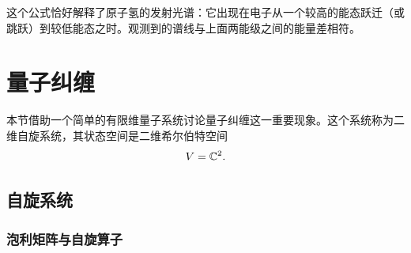 这个公式恰好解释了原子氢的发射光谱：它出现在电子从一个较高的能态跃迁（或跳跃）到较低能态之时。观测到的谱线与上面两能级之间的能量差相符。


\section{量子纠缠}

本节借助一个简单的有限维量子系统讨论量子纠缠这一重要现象。这个系统称为二维自旋系统，其状态空间是二维希尔伯特空间
\[
  V=\mathbb{C}^2.
\]

\subsection{自旋系统}

\subsubsection*{泡利矩阵与自旋算子}

